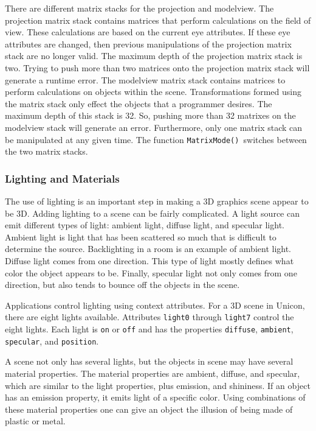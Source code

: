 There are different matrix stacks for the projection and modelview. The
projection matrix stack contains matrices that perform calculations on
the field of view. These calculations are based on the current eye
attributes. If these eye attributes are changed, then previous
manipulations of the projection matrix stack are no longer valid. The
maximum depth of the projection matrix stack is two. Trying to push
more than two matrices onto the projection matrix stack will generate a
runtime error. The modelview matrix stack contains matrices to perform
calculations on objects within the scene. Transformations formed using
the matrix stack only effect the objects that a programmer desires. The
maximum depth of this stack is 32. So, pushing more than 32 matrixes on
the modelview stack will generate an error. Furthermore, only one
matrix stack can be manipulated at any given time. The function
\texttt{MatrixMode()}\texttt{ }switches between the two matrix stacks. 

\subsubsection{Lighting and Materials}

The use of lighting is an important step in making a 3D graphics scene
appear to be 3D. Adding lighting to a scene can be fairly complicated.
A light source can emit different types of light: ambient light,
diffuse light, and specular light. Ambient light is light that has
been scattered so much that is difficult to determine the source.
Backlighting in a room is an example of ambient light. Diffuse light
comes from one direction. This type of light mostly defines what color
the object appears to be. Finally, specular light not only comes from
one direction, but also tends to bounce off the objects in the scene.

Applications control lighting using context attributes. For a 3D scene
in Unicon, there are eight lights available. Attributes \texttt{light0}
through \texttt{light7} control the eight lights. Each light is
\texttt{on} or \texttt{off} and has the properties \texttt{diffuse},
\texttt{ambient}, \texttt{specular}, and \texttt{position}. 

A scene not only has several lights, but the objects in scene may have
several material properties. The material properties are ambient,
diffuse, and specular, which are similar to the light properties, plus
emission, and shininess. If an object has an emission property, it
emits light of a specific color. Using combinations of these material
properties one can give an object the illusion of being made of plastic
or metal.

